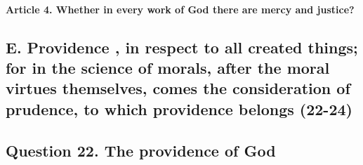 \documentclass{ucetd}
\begin{document}
\paragraph{Article 4. Whether in every work of God there are mercy and justice?}
\subsection{E. Providence  , in respect to all created things; for in the science of morals, after the moral virtues themselves, comes the consideration of prudence, to which providence belongs (22-24)}
\subsection{Question 22. The providence of God}
\end{document}
